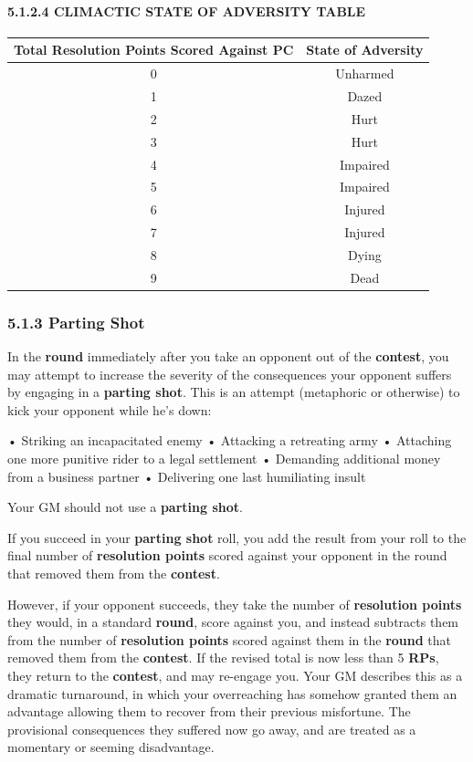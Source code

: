 \documentclass[
]{article}
\begin{document}
\hypertarget{climactic-state-of-adversity-table}{%
\paragraph{5.1.2.4 CLIMACTIC STATE OF ADVERSITY
TABLE}\label{climactic-state-of-adversity-table}}

\begin{longtable}[]{@{}cc@{}}
\toprule
Total Resolution Points Scored Against PC & State of
Adversity\tabularnewline
\midrule
\endhead
0 & Unharmed\tabularnewline
1 & Dazed\tabularnewline
2 & Hurt\tabularnewline
3 & Hurt\tabularnewline
4 & Impaired\tabularnewline
5 & Impaired\tabularnewline
6 & Injured\tabularnewline
7 & Injured\tabularnewline
8 & Dying\tabularnewline
9 & Dead\tabularnewline
\bottomrule
\end{longtable}

\hypertarget{parting-shot}{%
\subsubsection{5.1.3 Parting Shot}\label{parting-shot}}

In the \textbf{round} immediately after you take an opponent out of the
\textbf{contest}, you may attempt to increase the severity of the
consequences your opponent suffers by engaging in a \textbf{parting
shot}. This is an attempt (metaphoric or otherwise) to kick your
opponent while he's down:

• Striking an incapacitated enemy • Attacking a retreating army •
Attaching one more punitive rider to a legal settlement • Demanding
additional money from a business partner • Delivering one last
humiliating insult

Your GM should not use a \textbf{parting shot}.

If you succeed in your \textbf{parting shot} roll, you add the result
from your roll to the final number of \textbf{resolution points} scored
against your opponent in the round that removed them from the
\textbf{contest}.

However, if your opponent succeeds, they take the number of
\textbf{resolution points} they would, in a standard \textbf{round},
score against you, and instead subtracts them from the number of
\textbf{resolution points} scored against them in the \textbf{round}
that removed them from the \textbf{contest}. If the revised total is now
less than 5 \textbf{RPs}, they return to the \textbf{contest}, and may
re-engage you. Your GM describes this as a dramatic turnaround, in which
your overreaching has somehow granted them an advantage allowing them to
recover from their previous misfortune. The provisional consequences
they suffered now go away, and are treated as a momentary or seeming
disadvantage.
\end{document}
